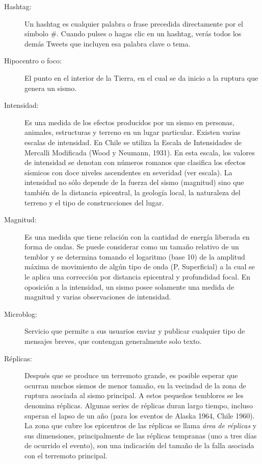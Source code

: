 \begin{description}
\item[Hashtag:] Un hashtag es cualquier palabra o frase precedida directamente por el símbolo \#. Cuando pulses o hagas clic en un hashtag, verás todos los demás Tweets que incluyen esa palabra clave o tema.\cite{twitterglosary}

\item[Hipocentro o foco:] El punto en el interior de la Tierra, en el cual se da inicio a la ruptura que genera un sismo.\cite{csnglosary}

\item[Intensidad:] Es una medida de los efectos producidos por un sismo en personas, animales, estructuras y terreno en un lugar particular. Existen varias escalas de intensidad. En Chile se utiliza la Escala de Intensidades de Mercalli Modificada (Wood y Neumann, 1931). En esta escala, los valores de intensidad se denotan con números romanos que clasifica los efectos sísmicos con doce niveles ascendentes en severidad (ver escala). La intensidad no sólo depende de la fuerza del sismo (magnitud) sino que también de la distancia epicentral, la geología local, la naturaleza del terreno y el tipo de construcciones del lugar.\cite{csnglosary}

\item[Magnitud:] Es una medida que tiene relación con la cantidad de energía liberada en forma de ondas. Se puede considerar como un tamaño relativo de un temblor y se determina tomando el logaritmo (base 10) de la amplitud máxima de movimiento de algún tipo de onda (P, Superficial) a la cual se le aplica una corrección por distancia epicentral y profundidad focal. En oposición a la intensidad, un sismo posee solamente una medida de magnitud y varias observaciones de intensidad.\cite{csnglosary}

\item[Microblog:] Servicio que permite a sus usuarios enviar y publicar cualquier tipo de mensajes breves, que contengan generalmente solo texto.\cite{microbloggingwiki}

\item[Réplicas:] Después que se produce un terremoto grande, es posible esperar que ocurran muchos sismos de menor tamaño, en la vecindad de la zona de ruptura asociada al sismo principal. A estos pequeños temblores se les denomina réplicas. Algunas series de réplicas duran largo tiempo, incluso superan el lapso de un año (para los eventos de Alaska 1964, Chile 1960). La zona que cubre los epicentros de las réplicas se llama \textit{área de réplicas} y sus dimensiones, principalmente de las réplicas tempranas (uno a tres días de ocurrido el evento), son una indicación del tamaño de la falla asociada con el terremoto principal.\cite{csnglosary}


\end{description}
